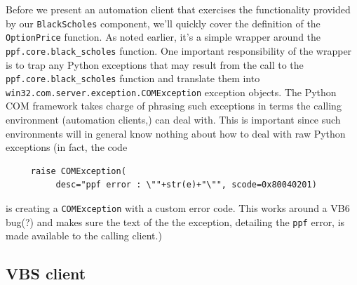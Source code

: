 Before we present an automation client that exercises the
functionality provided by our \verb|BlackScholes| component, we'll
quickly cover the definition of the \verb|OptionPrice| function. As
noted earlier, it's a simple wrapper around the
\verb|ppf.core.black_scholes| function. One important responsibility
of the wrapper is to trap any Python exceptions that may result from
the call to the \verb|ppf.core.black_scholes| function and translate
them into\\ \verb|win32.com.server.exception.COMException| exception
objects. The Python COM framework takes charge of phrasing such
exceptions in terms the calling environment (automation clients,) can
deal with. This is important since such environments will in general
know nothing about how to deal with raw Python exceptions (in fact,
the code
\begin{verbatim}
     raise COMException(
          desc="ppf error : \""+str(e)+"\"", scode=0x80040201)
\end{verbatim}
is creating a \verb|COMException| with a custom error
code. This works around a VB6 bug(?) and makes sure the text of the
the exception, detailing the \verb|ppf| error, is made available to
the calling client.)

\subsection{VBS client}

